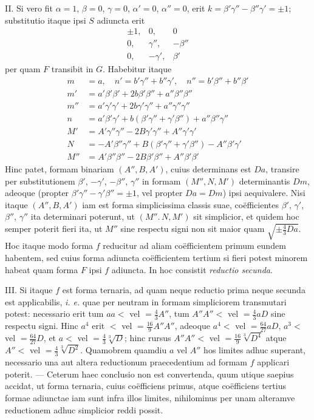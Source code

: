 II. Si vero fit \(\alpha=1\), \(\beta=0\), \(\gamma=0\), \(\alpha'=0\), \(\alpha''=0\), erit \(k=\beta'\gamma''-\beta''\gamma'=\pm1\); substitutio itaque ipsi \(S\) adiuncta erit
\[
\begin{array}{rrr}
\pm1,&0,&0\\
0,&\gamma'',&-\beta''\\
0,&-\gamma',&\beta'
\end{array}
\]
per quam \(F\) transibit in \(G\). Habebitur itaque
\[
\begin{aligned}
m&=a,\quad n'=b'\gamma''+b''\gamma',\quad n''=b'\beta''+b''\beta'\\
m'&=a'\beta'\beta'+2b\beta'\beta''+a''\beta''\beta''\\
m''&=a'\gamma'\gamma'+2b\gamma'\gamma''+a''\gamma''\gamma''\\
n&=a'\beta'\gamma'+b(\beta'\gamma''+\gamma'\beta'')+a''\beta''\gamma''\\
M'&=A'\gamma''\gamma''-2B\gamma'\gamma''+A''\gamma'\gamma'\\
N&=-A'\beta''\gamma''+B(\beta'\gamma''+\gamma'\beta'')-A''\beta'\gamma'\\
M''&=A'\beta''\beta''-2B\beta'\beta''+A''\beta'\beta'
\end{aligned}
\]
Hinc patet, formam binariam \((A'',B,A')\), cuius determinans est \(Da\), transire per substitutionem \(\beta'\), \(-\gamma'\), \(-\beta''\), \(\gamma''\) in formam \((M'',N,M')\) determinantis \(Dm\), adeoque (propter \(\beta'\gamma''-\gamma'\beta''=\pm1\), vel propter \(Da=Dm\)) ipsi aequivalere. Nisi itaque \((A'',B,A')\) iam est forma simplicissima classis suae, co\"efficientes \(\beta'\), \(\gamma'\), \(\beta''\), \(\gamma''\) ita determinari poterunt, ut \((M''.\,N,M')\) sit simplicior, et quidem hoc semper poterit fieri ita, ut \(M''\) sine respectu signi non sit maior quam \(\sqrt{\pm\frac{4}{3}Da}\). Hoc itaque modo forma \(f\) reducitur ad aliam co\"efficientem primum eundem habentem, sed cuius forma adiuncta co\"efficientem tertium si fieri potest minorem habeat quam forma \(F\) ipsi \(f\) adiuncta. In hoc consistit \emph{reductio secunda}.

III. Si itaque \(f\) est forma ternaria, ad quam neque reductio prima neque secunda est applicabilis, \emph{i. e.} quae per neutram in formam simpliciorem transmutari potest: necessario erit tum \(aa<\) vel \(=\frac{4}{3}A''\), tum \(A''A''<\) vel \(=\frac{4}{3}aD\) sine respectu signi. Hinc \(a^4\) erit \(<\) vel \(=\frac{16}{9}A''A''\), adeoque \(a^4<\) vel \(=\frac{64}{27}aD\), \(a^3<\) vel \(=\frac{64}{27}D\), et \(a<\) vel \(=\frac{4}{3}\sqrt[3]{D}\); hinc rursus \(A''A''<\) vel \(=\frac{16}{9}\sqrt[3]{D^4}\) atque \(A''<\) vel \(=\frac{4}{3}\sqrt[3]{D^2}\). Quamobrem quamdiu \(a\) vel \(A''\) hos limites adhuc superant, necessario una aut altera reductionum praecedentium ad formam \(f\) applicari poterit. --- Ceterum haec conclusio non est convertenda, quum utique saepius
accidat, ut forma ternaria, cuius co\"efficiens primus, atque co\"efficiens tertius formae adiunctae iam sunt infra illos limites, nihilominus per unam alteramve reductionem adhuc simplicior reddi possit.

